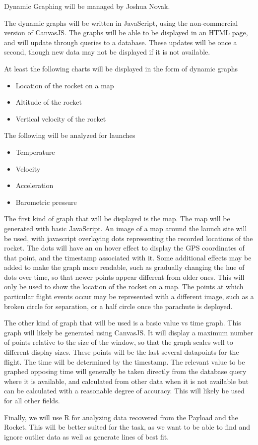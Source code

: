 \documentclass[onecolumn, draftclsnofoot, 10pt, compsoc]{IEEEtran}
\begin{document}
Dynamic Graphing will be managed by Joshua Novak.

The dynamic graphs will be written in JavaScript, using the non-commercial version of CanvasJS. The graphs will be able to be displayed in an HTML page, and will update through queries to a database. These updates will be once a second, though new data may not be displayed if it is not available.

At least the following charts will be displayed in the form of dynamic graphs
\begin{itemize}
\item Location of the rocket on a map
\item Altitude of the rocket
\item Vertical velocity of the rocket
\end{itemize}

The following will be analyzed for launches
\begin{itemize}
\item Temperature
\item Velocity
\item Acceleration
\item Barometric pressure
\end{itemize}

The first kind of graph that will be displayed is the map. The map will be generated with basic JavaScript. An image of a map around the launch site will be used, with javascript overlaying dots representing the recorded locations of the rocket. The dots will have an on hover effect to display the GPS coordinates of that point, and the timestamp associated with it. Some additional effects may be added to make the graph more readable, such as gradually changing the hue of dots over time, so that newer points appear different from older ones. This will only be used to show the location of the rocket on a map. The points at which particular flight events occur may be represented with a different image, such as a broken circle for separation, or a half circle once the parachute is deployed.

The other kind of graph that will be used is a basic value vs time graph. This graph will likely be generated using CanvasJS. It will display a maximum number of points relative to the size of the window, so that the graph scales well to different display sizes. These points will be the last several datapoints for the flight. The time will be determined by the timestamp. The relevant value to be graphed opposing time will generally be taken directly from the database query where it is available, and calculated from other data when it is not available but can be calculated with a reasonable degree of accuracy. This will likely be used for all other fields.

Finally, we will use R for analyzing data recovered from the Payload and the Rocket. This will be better suited for the task, as we want to be able to find and ignore outlier data as well as generate lines of best fit.



\end{document}
